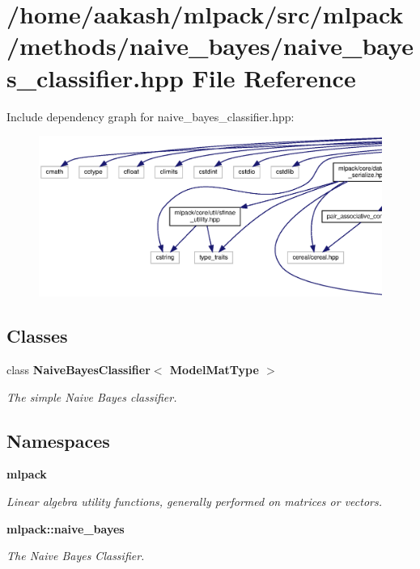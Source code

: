 \section{/home/aakash/mlpack/src/mlpack/methods/naive\+\_\+bayes/naive\+\_\+bayes\+\_\+classifier.hpp File Reference}
\label{naive__bayes__classifier_8hpp}
Include dependency graph for naive\+\_\+bayes\+\_\+classifier.\+hpp\+:
\nopagebreak
\begin{figure}[H]
\begin{center}
\leavevmode
\includegraphics[width=350pt]{naive__bayes__classifier_8hpp__incl}
\end{center}
\end{figure}
\subsection*{Classes}
\begin{DoxyCompactItemize}
\item 
class \textbf{ Naive\+Bayes\+Classifier$<$ Model\+Mat\+Type $>$}
\begin{DoxyCompactList}\small\item\em The simple Naive Bayes classifier. \end{DoxyCompactList}\end{DoxyCompactItemize}
\subsection*{Namespaces}
\begin{DoxyCompactItemize}
\item 
 \textbf{ mlpack}
\begin{DoxyCompactList}\small\item\em Linear algebra utility functions, generally performed on matrices or vectors. \end{DoxyCompactList}\item 
 \textbf{ mlpack\+::naive\+\_\+bayes}
\begin{DoxyCompactList}\small\item\em The Naive Bayes Classifier. \end{DoxyCompactList}\end{DoxyCompactItemize}


